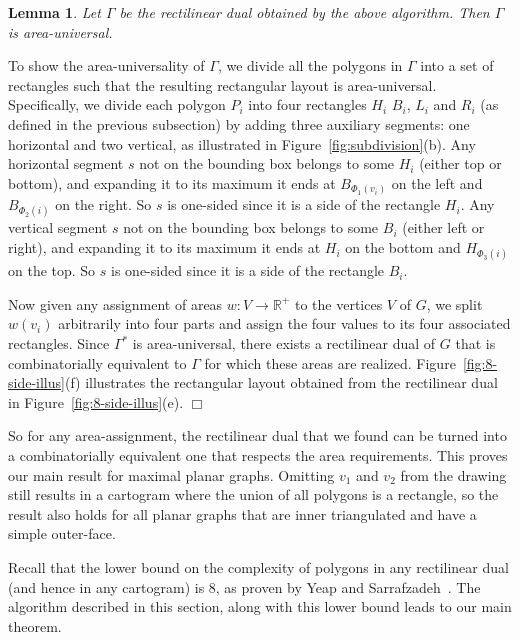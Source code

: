 \documentclass[11pt]{article}
\newtheorem{lemma}{Lemma}[section]
\newenvironment{proof}{{\bf Proof:} }{\hspace*{\fill}$\Box$\vspace{2mm}}
\begin{document}
\begin{lemma}
\label{lem:eight-suff} Let $\Gamma$ be the rectilinear dual
obtained by the above algorithm. Then $\Gamma$ is area-universal.
\end{lemma}
\begin{proof} To show the area-universality of $\Gamma$, we divide all the
polygons in $\Gamma$ into a set of rectangles such that the resulting
rectangular layout is area-universal. Specifically, we divide each polygon $P_i$
into four rectangles $H_i$ $B_i$, $L_i$ and $R_i$ (as defined in the previous subsection)
by adding three auxiliary segments: one horizontal and two vertical, as illustrated in
Figure~\ref{fig:subdivision}(b).
Any horizontal segment $s$ not on the bounding box belongs to some $H_i$
(either top or bottom), and expanding it to its maximum it ends at
$B_{\Phi_1(v_i)}$ on the left and $B_{\Phi_2(i)}$ on the right.  So $s$
is one-sided since it is a side of the rectangle $H_i$.
Any vertical segment $s$ not on the bounding box belongs to some $B_i$
(either left or right), and expanding it to its maximum it ends at
$H_i$ on the bottom and $H_{\Phi_3(i)}$ on the top.  So $s$
is one-sided since it is a side of the rectangle $B_i$.

Now given any assignment of areas $w:V\rightarrow \mathbb{R}^+$ to the vertices $V$ of $G$, we split $w(v_i)$ arbitrarily
 into four parts and assign the four values to its four associated rectangles. Since $\Gamma ^*$ is area-universal,
 there exists a rectilinear dual of $G$ that is combinatorially equivalent to $\Gamma$ for which these areas are realized.
Figure~\ref{fig:8-side-illus}(f) illustrates the rectangular
layout obtained from the rectilinear dual in Figure~\ref{fig:8-side-illus}(e).
\end{proof}


So for any area-assignment, the rectilinear dual that we found can
be turned into a combinatorially equivalent one that respects the
area requirements.  This proves our main result for maximal planar
graphs. Omitting $v_1$ and $v_2$ from the drawing
still results in a cartogram where the union of all polygons is a
rectangle, so the result also holds for all planar graphs that are
inner triangulated and have a simple outer-face.

Recall that the lower bound on the complexity
of polygons in any rectilinear dual (and hence in any cartogram) is 8,
as proven by Yeap and Sarrafzadeh~\cite{ys93}. The algorithm described
in this section, along with this lower bound leads to our main theorem.
\end{document}
